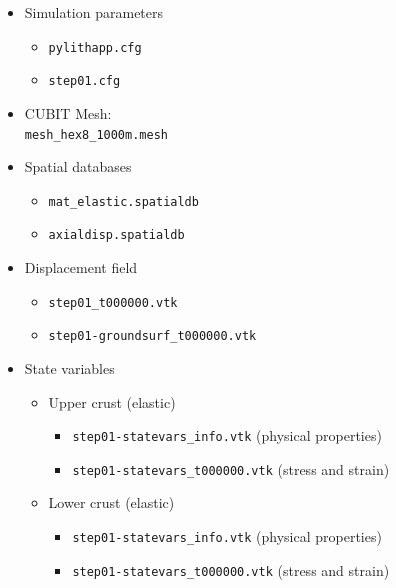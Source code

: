 \documentclass[pdftex,cig,slideColor]{pp4slides}
\begin{document}
  \begin{minipage}[t]{4in}
    {}
    \begin{itemize}
    \item Simulation parameters
      \begin{itemize}
      \item {\tt pylithapp.cfg}
      \item {\tt step01.cfg}
      \end{itemize}
    \item CUBIT Mesh: \\ {\tt mesh\_hex8\_1000m.mesh}
    \item Spatial databases
      \begin{itemize}
      \item {\tt mat\_elastic.spatialdb}
      \item {\tt axialdisp.spatialdb}
      \end{itemize}
    \end{itemize}
  \end{minipage}
  \hfill
  \begin{minipage}[t]{4.75in}
    {}
    \begin{itemize}
   \item Displacement field
      \begin{itemize}
      \item {\tt step01\_t000000.vtk}
      \item {\tt step01-groundsurf\_t000000.vtk}
      \end{itemize}
    \item State variables
      \begin{itemize}
      \item Upper crust (elastic)
        \begin{itemize}
        \item {\tt step01-statevars\_info.vtk} (physical properties)
        \item {\tt step01-statevars\_t000000.vtk} (stress and strain)
        \end{itemize}
      \item Lower crust (elastic)
        \begin{itemize}
        \item {\tt step01-statevars\_info.vtk} (physical properties)
        \item {\tt step01-statevars\_t000000.vtk} (stress and strain)
        \end{itemize}
      \end{itemize}
    \end{itemize}
  \end{minipage}   
\end{document}

